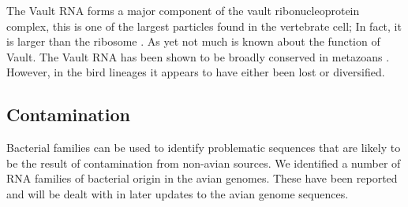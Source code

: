 \documentclass[10pt]{bmc_article}
\newenvironment{bmcformat}{\begin{raggedright}\baselineskip20pt\sloppy\setboolean{publ}{false}}{\end{raggedright}\baselineskip20pt\sloppy}
\begin{document}
\begin{bmcformat}
The Vault RNA forms a major component of the vault ribonucleoprotein
complex, this is one of the largest particles found in the vertebrate
cell; In fact, it is larger than the ribosome \cite{Kong:1999}. As yet
not much is known about the function of Vault. The Vault RNA has been
shown to be broadly conserved in metazoans
\cite{Stadler:2009}. However, in the bird lineages it appears to have
either been lost or diversified.


\subsection*{Contamination}

Bacterial families can be used to identify problematic sequences that
are likely to be the result of contamination from non-avian
sources. We identified a number of RNA families of bacterial origin in
the avian genomes. These have been reported and will be dealt with in
later updates to the avian genome sequences.




\clearpage
\newpage


\end{bmcformat}
\end{document}
